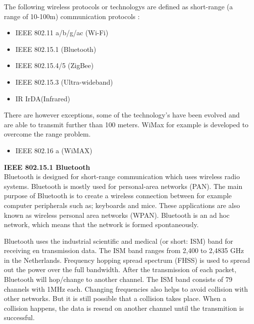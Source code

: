 \documentclass[10pt,a4paper]{article}
\begin{document}
The following wireless protocols or technologys are defined as short-range (a range of 10-100m) communication protocols \cite{emergingstandarsforwirelessmeshtechnology} \cite{combook}:
\begin{itemize}
\setlength\itemsep{0em}
    \item IEEE 802.11 a/b/g/ac (Wi-Fi) \cite{IEEE80211timeline}
    \item IEEE 802.15.1 (Bluetooth)
    \item IEEE 802.15.4/5 (ZigBee)
    \item IEEE 802.15.3 (Ultra-wideband)
    \item IR IrDA(Infrared)
\end{itemize}
 There are however exceptions, some of the technology's have been evolved and are able to transmit further than 100 meters. WiMax for example is developed to overcome the range problem. 
\begin{itemize}
\setlength\itemsep{0em}
     \item IEEE 802.16 a (WiMAX)
\end{itemize}

\textbf{\large IEEE 802.15.1 Bluetooth}\\
Bluetooth is designed for short-range communication which uses wireless radio systems. Bluetooth is mostly used for personal-area networks (PAN). \cite{combook} The main purpose of Bluetooth is to create a wireless connection between for example computer peripherals such as; keyboards and mice. These applications are also known as wireless personal area networks (WPAN). \cite{comparitivestudywirelessprotocols} Bluetooth is an ad hoc network, which means that the network is formed spontaneously.\cite{tcipbook}

Bluetooth uses the industrial scientific and medical (or short: ISM) band for receiving en transmission data. The ISM band ranges from 2,400 to 2,4835 GHz in the Netherlands. \cite{frequencyandsnetherlands} Frequency hopping spread spectrum (FHSS) is used to spread out the power over the full bandwidth. After the transmission of each packet, Bluetooth will hop/change to another channel. The ISM band consists of 79 channels with 1MHz each. Changing frequencies also helps to avoid collision with other networks. But it is still possible that a collision takes place. When a collision happens, the data is resend on another channel until the transmition is successful.
\end{document}
